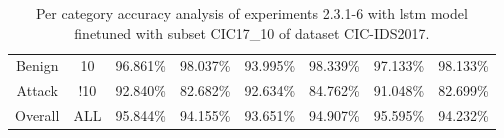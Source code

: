 \begin{table}[htb]
{\begin{tabular}{@{}cccccccc@{}}
         \\
        Benign &  10 &  96.861\% &  98.037\% &  93.995\% &  98.339\% &  97.133\% &  98.133\% \\
        Attack &  !10 &  92.840\% &  82.682\% &  92.634\% &  84.762\% &  91.048\% &  82.699\% \\
        Overall &  ALL &  95.844\% &  94.155\% &  93.651\% &  94.907\% &  95.595\% &  94.232\% \\
        \bottomrule
    \end{tabular}}
    \caption{Per category accuracy analysis of experiments 2.3.1-6 with \gls{lstm} model finetuned with subset CIC17\_10 of dataset CIC-IDS2017.}
    \label{table:results:lstm:class_flows_subset}
\end{table}